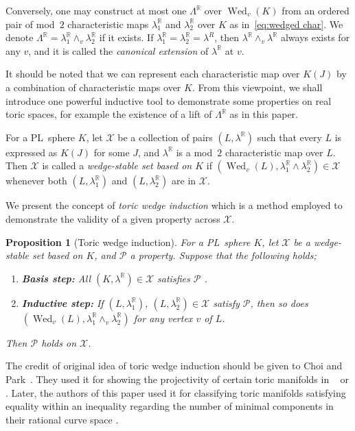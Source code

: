 \documentclass[11pt]{amsart}
\theoremstyle{plain}
\newtheorem{proposition}[theorem]{Proposition}
\numberwithin{equation}{section}
\theoremstyle{definition}
\newcommand{\R}{\mathbb{R}}
\newcommand{\cP}{\mathcal{P}}
\newcommand{\cX}{\mathcal{X}}
\DeclareMathOperator{\wed}{Wed}
\begin{document}
Conversely, one may construct at most one $\Lambda^\R$ over $\wed_{v}(K)$ from an ordered pair of mod~$2$ characteristic maps $\lambda_1^\R$ and $\lambda_2^\R$ over $K$ as in~\eqref{eq:wedged char}.
We denote $\Lambda^\R = \lambda_1^\R \wedge_v \lambda_2^\R$ if it exists.
If $\lambda_1^\R = \lambda_2^\R = \lambda^R$, then $\lambda^\R \wedge_v \lambda^\R$ always exists for any $v$, and it is called the \emph{canonical extension} of $\lambda^\R$ at $v$.



It should be noted that we can represent each characteristic map over $K(J)$ by a combination of characteristic maps over $K$.
From this viewpoint, we shall introduce one powerful inductive tool to demonstrate some properties on real toric spaces, for example the existence of a lift of $\Lambda^\R$ as in this paper.

For a PL~sphere $K$, let $\cX$ be a collection of pairs $(L, \lambda^\R)$ such that every $L$ is expressed as $K(J)$ for some $J$, and $\lambda^\R$ is a mod~$2$ characteristic map over $L$.
Then $\cX$ is called a \emph{wedge-stable set based on $K$} if  $(\wed_v(L), \lambda_1^\R \wedge \lambda_2^\R) \in \cX$ whenever both $(L, \lambda_1^\R)$ and $(L, \lambda_2^\R)$ are in $\cX$.

We present the concept of \emph{toric wedge induction} which is a method employed to demonstrate the validity of a given property across $\cX$.

\begin{proposition}[Toric wedge induction] \label{TWI}
    For a PL~sphere $K$, let $\cX$ be a wedge-stable set based on $K$, and $\cP$ a property.
    Suppose that the following holds;
    \begin{enumerate}
      \item \textbf{Basis step:} All $(K, \lambda^\R) \in \cX$ satisfies $\cP$ .
      \item \textbf{Inductive step:} If $(L, \lambda_1^\R)$, $(L, \lambda_2^\R) \in \cX$ satisfy $\cP$, then so does $(\wed_v(L), \lambda_1^\R \wedge_v \lambda_2^\R)$ for any vertex $v$ of $L$.
    \end{enumerate}
    Then $\cP$ holds on $\cX$.
\end{proposition}


The credit of original idea of toric wedge induction should be given to Choi and Park~\cite{Choi-Park2016}.
They used it for showing the projectivity of certain toric manifolds in  ~\cite{Choi-Park2016} or \cite{CP_CP_variety}. 
Later, the authors of this paper used it for classifying toric manifolds satisfying equality within an inequality regarding the number of minimal components in their rational curve space \cite{Choi-Jang-Vallee2023}.
\end{document}
